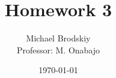 


\title{Homework 3}
\date{\today}
\author{Michael Brodskiy\\ \small Professor: M. Onabajo}



\maketitle


